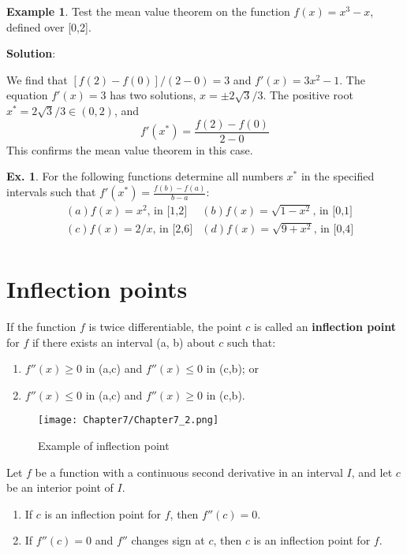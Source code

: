 \documentclass[10pt,a4paper]{book}
\theoremstyle{definition}\newtheorem{definition}{Definition}
\theoremstyle{definition}\newtheorem{fact}{Fact}
\theoremstyle{definition}\newtheorem{ex}{Ex.}
\theoremstyle{definition}\newtheorem{project}{Project}
\theoremstyle{definition}\newtheorem{problem}{Problem}
\theoremstyle{definition}\newtheorem{example}{Example}
\numberwithin{theorem}{chapter}
\numberwithin{corollary}{chapter}
\numberwithin{assumption}{chapter}
\numberwithin{definition}{chapter}
\numberwithin{prop}{chapter}
\numberwithin{notation}{chapter}
\numberwithin{problem}{chapter}
\numberwithin{example}{chapter}
\numberwithin{fact}{chapter}
\numberwithin{ex}{chapter}
\begin{document}
	\begin{example}
		Test the mean value theorem on the function $f(x)=x^3-x$, defined over [0,2].
		
		\textbf{Solution}:
		
		We find that $[f(2) - f(0)]/(2 - 0) = 3$ and $f'(x) = 3x^2 - 1$. The equation
		$f'(x) = 3$ has two solutions, $x = \pm2\sqrt{3}/3$. The positive root $x^{*} = 2\sqrt{3}/3 \in (0, 2)$, and
		$$f'(x^{*}) = \frac{f(2)-f(0)}{2-0}$$
		This confirms the mean value theorem in this case.
	\end{example}
	
	\begin{ex}
		For the following functions determine all numbers $x^{*}$ in the specified intervals such that $f'(x^{*}) = \frac{f(b)-f(a)}{b-a}$:
		\begin{align*}
			& (a) f(x) = x^2 \text{, in [1,2]}          
			& (b) f(x) = \sqrt{1-x^2} \text{, in [0,1]} \\
			& (c) f(x) = 2/x \text{, in [2,6]}          
			& (d) f(x) = \sqrt{9+x^2} \text{, in [0,4]} \\
		\end{align*}
	\end{ex}
	
	\section{Inflection points}
	
	If the function $f$ is twice differentiable, the point $c$ is called an \textbf{inflection point} for $f$ if there exists an interval (a, b) about $c$ such that:
	\begin{enumerate}[label=(\alph*)]
		\item $f''(x) \geq 0$ in (a,c) and $f''(x) \leq 0$ in (c,b); or
		\item $f''(x) \leq 0$ in (a,c) and $f''(x) \geq 0$ in (c,b).
	\end{enumerate}
	
	\begin{figure}[H]
		\centering
		\texttt{[image: Chapter7/Chapter7\_2.png]}
		\caption{Example of inflection point}
	\end{figure}
	
	Let $f$ be a function with a continuous second derivative in an interval $I$, and let $c$ be an interior point of $I$.
	\begin{enumerate}[label=(\alph*)]
		\item If $c$ is an inflection point for $f$, then $f''(c) = 0$.
		\item If $f''(c) = 0$ and $f''$ changes sign at $c$, then $c$ is an inflection point for $f$.
	\end{enumerate}
	
\end{document}
